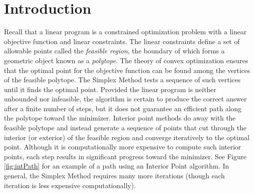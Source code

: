 
\def\Mu{\boldsymbol{\mu}}
\def\Lamb{\boldsymbol{\lambda}}
\def\Beta{\boldsymbol{\beta}}


\section*{Introduction}

Recall that a linear program is a constrained optimization problem with a linear objective function and linear constraints.
The linear constraints define a set of allowable points called the \emph{feasible region}, the boundary of which forms a geometric object known as a \emph{polytope}.
The theory of convex optimization ensures that the optimal point for the objective function can be found among the vertices of the feasible polytope. The Simplex Method tests a sequence of such vertices until it finds
the optimal point.
Provided the linear program is neither unbounded nor infeasible, the algorithm is certain to produce the correct answer after a finite number of steps, but it does not guarantee an efficient path along the polytope toward the minimizer.
Interior point methods do away with the feasible polytope and instead generate a sequence of points that cut through the interior (or exterior) of the feasible region and converge iteratively to the optimal point.
Although it is computationally more expensive to compute such interior points, each step results in significant progress toward the minimizer.
See Figure \ref{fig:intPath} for an example of a path using an Interior Point algorithm.
In general, the Simplex Method requires many more iterations (though each iteration is less expensive computationally).

